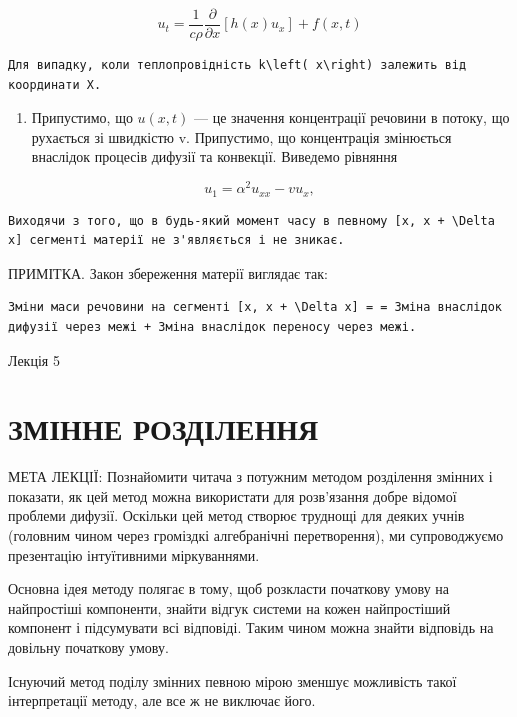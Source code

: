 \documentclass[
  ukrainian,
]{article}
\providecommand{\tightlist}{%
  \setlength{\itemsep}{0pt}\setlength{\parskip}{0pt}}
\begin{document}
\[
u_{t} = \frac{1}{c\rho} \frac{\partial}{\partial x} [h(x) u_{x}] + f(x, t)
\]

\begin{verbatim}
Для випадку, коли теплопровідність k\left( x\right) залежить від координати X.
\end{verbatim}

\begin{enumerate}
\def\labelenumi{\arabic{enumi}.}
\setcounter{enumi}{3}
\tightlist
\item
  Припустимо, що \(u(x, t)\) --- це значення концентрації речовини в
  потоку, що рухається зі швидкістю v. Припустимо, що концентрація
  змінюється внаслідок процесів дифузії та конвекції. Виведемо рівняння
\end{enumerate}

\[
u_1 = \alpha^2 u_{xx} - v u_x,
\]

\begin{verbatim}
Виходячи з того, що в будь-який момент часу в певному [x, x + \Delta x] сегменті матерії не з'являється і не зникає.
\end{verbatim}

ПРИМІТКА. Закон збереження матерії виглядає так:

\begin{verbatim}
Зміни маси речовини на сегменті [x, x + \Delta x] = = Зміна внаслідок дифузії через межі + Зміна внаслідок переносу через межі.
\end{verbatim}

Лекція 5

\section{ЗМІННЕ
РОЗДІЛЕННЯ}\label{ux437ux43cux456ux43dux43dux435-ux440ux43eux437ux434ux456ux43bux435ux43dux43dux44f}

МЕТА ЛЕКЦІЇ: Познайомити читача з потужним методом розділення змінних і
показати, як цей метод можна використати для розв'язання добре відомої
проблеми дифузії. Оскільки цей метод створює труднощі для деяких учнів
(головним чином через громіздкі алгебранічні перетворення), ми
супроводжуємо презентацію інтуїтивними міркуваннями.

Основна ідея методу полягає в тому, щоб розкласти початкову умову на
найпростіші компоненти, знайти відгук системи на кожен найпростіший
компонент і підсумувати всі відповіді. Таким чином можна знайти
відповідь на довільну початкову умову.

Існуючий метод поділу змінних певною мірою зменшує можливість такої
інтерпретації методу, але все ж не виключає його.
\end{document}
